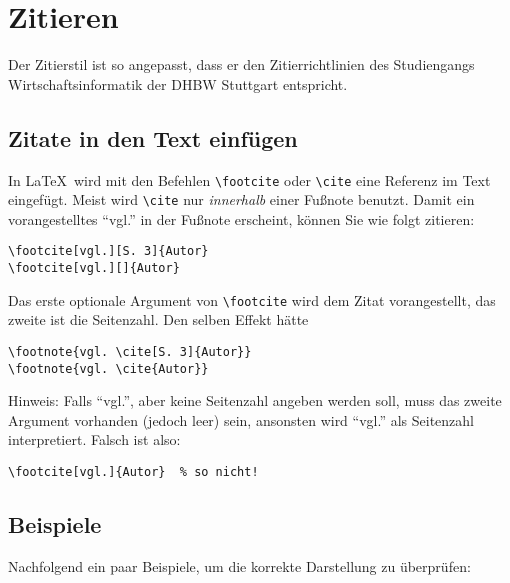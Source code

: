 \chapter{Zitieren}\label{chapter:zitate}

Der Zitierstil ist so angepasst, dass er den Zitierrichtlinien des Studiengangs Wirtschaftsinformatik der DHBW Stuttgart entspricht. 

\section{Zitate in den Text einfügen}
In \LaTeX\ wird mit den Befehlen \verb|\footcite| 
oder 
\verb|\cite|
eine Referenz im Text eingefügt. Meist wird \verb|\cite| nur \emph{innerhalb} einer Fußnote benutzt. 
Damit ein vorangestelltes \enquote{vgl.} in der Fußnote erscheint, können Sie wie folgt zitieren:
\begin{verbatim}
\footcite[vgl.][S. 3]{Autor}
\footcite[vgl.][]{Autor}
\end{verbatim}

Das erste optionale Argument von \verb|\footcite| wird dem Zitat vorangestellt, das zweite ist die Seitenzahl. Den selben Effekt hätte
\begin{verbatim}
\footnote{vgl. \cite[S. 3]{Autor}}
\footnote{vgl. \cite{Autor}}
\end{verbatim}

Hinweis: Falls \enquote{vgl.}, aber keine Seitenzahl angeben werden soll, muss das zweite Argument vorhanden (jedoch leer) sein, ansonsten wird \enquote{vgl.} als Seitenzahl interpretiert. Falsch ist also: 
\begin{verbatim}
\footcite[vgl.]{Autor}  % so nicht!
\end{verbatim}



\section{Beispiele}
Nachfolgend ein paar Beispiele, um die korrekte Darstellung zu überprüfen:

